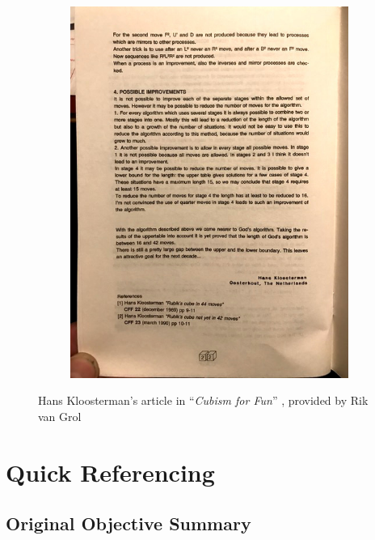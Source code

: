 \documentclass{report}
\newcommand{\tit}[1]{\textit{#1}}
\newcommand{\propernoun}[1]{\enquote{\tit{#1}}}
\begin{document}
\begin{appendices}
\begin{figure}[H]
\begin{subfigure}[b]{0.45\textwidth}
				\includegraphics[width=\textwidth]{Resources/Images/imgKloosterman4.jpg}
			\end{subfigure}
			\caption{Hans Kloosterman's article in \propernoun{Cubism for Fun} \cite{Kloosterman1990}, provided by Rik van Grol}
			\label{app:kloostermanCFF}
		\end{figure}
	
		\chapter{Quick Referencing}
		
		\section*{Original Objective Summary} \label{app:objectives}
		

\end{appendices}
\end{document}
